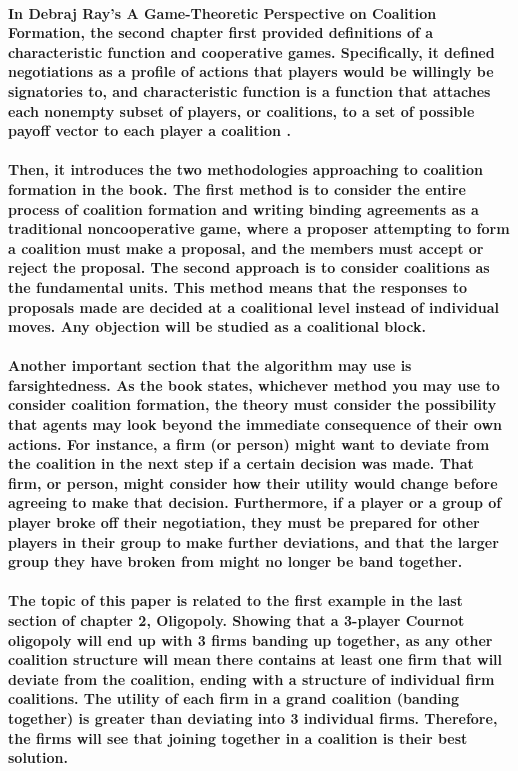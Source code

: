 \documentclass[11pt]{report}
\begin{document}
\paragraph{In Debraj Ray's A Game-Theoretic Perspective on Coalition Formation, the second chapter first provided definitions of a characteristic function and cooperative games. Specifically, it defined negotiations as a profile of actions that players would be willingly be signatories to, and characteristic function is a function that attaches each nonempty subset of players, or coalitions, to a set of possible payoff vector to each player a coalition \cite[Chapter 2]{ray2007ch2}. } \paragraph{Then, it introduces the two methodologies approaching to coalition formation in the book. The first method is to consider the entire process of coalition formation and writing binding agreements as a traditional noncooperative game, where a proposer attempting to form a coalition must make a proposal, and the members must accept or reject the proposal. The second approach is to consider coalitions as the fundamental units. This method means that the responses to proposals made are decided at a coalitional level instead of individual moves. Any objection will be studied as a coalitional block. }

\paragraph{Another important section that the algorithm may use is farsightedness. As the book states, whichever method you may use to consider coalition formation, the theory must consider the possibility that agents may look beyond the immediate consequence of their own actions. For instance, a firm (or person) might want to deviate from the coalition in the next step if a certain decision was made. That firm, or person, might consider how their utility would change before agreeing to make that decision. Furthermore, if a player or a group of player broke off their negotiation, they must be prepared for other players in their group to make further deviations, and that the larger group they have broken from might no longer be band together. }

\paragraph{The topic of this paper is related to the first example in the last section of chapter 2, Oligopoly. Showing that a 3-player Cournot oligopoly will end up with 3 firms banding up together, as any other coalition structure will mean there contains at least one firm that will deviate from the coalition, ending with a structure of individual firm coalitions. The utility of each firm in a grand coalition (banding together) is greater than deviating into 3 individual firms. Therefore, the firms will see that joining together in a coalition is their best solution. }
\end{document}
